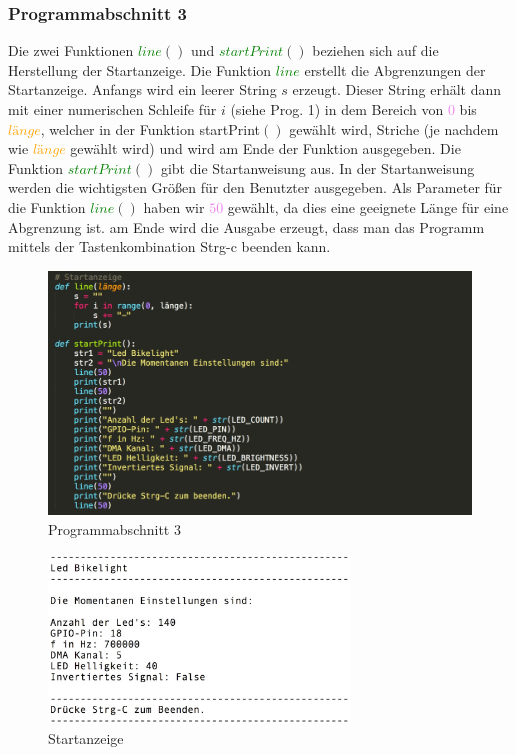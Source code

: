 \documentclass [a4paper, 11pt] {article}
\begin{document}
\subsubsection{Programmabschnitt 3}
Die zwei Funktionen \textcolor{green}{$line$}{$()$} und \textcolor{green}{$startPrint$}{$()$} beziehen sich auf die Herstellung der Startanzeige.
Die Funktion \textcolor{green}{$line$} erstellt die Abgrenzungen der Startanzeige. Anfangs wird ein leerer String {$s$} erzeugt. Dieser String erhält dann mit einer numerischen Schleife für {$i$} (siehe Prog. 1) in dem Bereich von \textcolor{violet}{$0$} bis \textcolor{orange}{$l\text{ä}nge$}, welcher in der Funktion startPrint{$()$} gewählt wird, Striche (je nachdem wie \textcolor{orange}{$l\text{ä}nge$} gewählt wird) und wird am Ende der Funktion ausgegeben. Die Funktion \textcolor{green}{$startPrint$}{$()$} gibt die Startanweisung aus. In der Startanweisung werden die wichtigsten Größen für den Benutzter ausgegeben. Als Parameter für die Funktion \textcolor{green}{$line$}{$()$} haben wir \textcolor{violet}{$50$} gewählt, da dies eine geeignete Länge für eine Abgrenzung ist. am Ende wird die Ausgabe erzeugt, dass man das Programm mittels der Tastenkombination Strg-c beenden kann.
\begin{figure}[h]
	\centering
	\includegraphics[width=16cm]{P3.png}
	\caption{Programmabschnitt 3}
\end{figure}
\begin{figure}[h]
	\centering
	\includegraphics[width=8cm]{Startanzeige.png}
	\caption{Startanzeige}
\end{figure}
\end{document}
